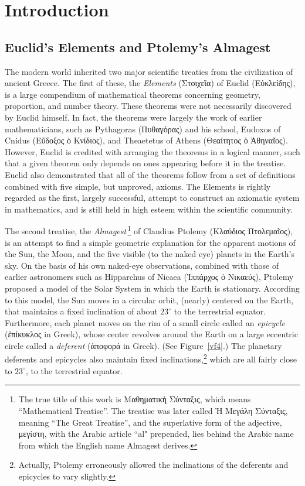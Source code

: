 \chapter{Introduction} 

\section{Euclid's Elements and Ptolemy's Almagest}
The modern world inherited two major scientific treaties from the civilization
of ancient Greece. 
The first of these, the  {\em Elements}\/ (Στοιχεῖα) of Euclid (Εὐκλείδης), is a
large compendium of mathematical theorems concerning geometry, proportion, and number
theory. These theorems were not necessarily discovered by Euclid
himself. In fact, the theorems were largely the work of earlier mathematicians,
such as Pythagoras (Πυθαγόρας) and his school, Eudoxos of Cnidus (Εὔδοξος ὁ Κνίδιος), and Theaetetus of Athens (Θεαίτητος ὁ Ἀθηναῖος). However, Euclid is credited with arranging the theorems 
 in a logical manner, such that a given theorem only depends on ones appearing before it in the treatise. Euclid also demonstrated  that all of the theorems follow from a set of definitions combined with five simple, but unproved, axioms. 
The Elements is rightly regarded
as the first, largely successful, attempt to construct an
axiomatic system in mathematics, and is still held in high esteem within
the scientific community.

The second treatise, the {\em Almagest}\,\footnote{The true title
of this work is Μαθηματικὴ Σύνταξις, which means ``Mathematical Treatise''.  The treatise was later called  Ἡ Μεγάλη Σύνταξις,  meaning ``The Great Treatise'',
and the superlative form of the adjective, μεγίστη,  with the Arabic article ``al" prepended, lies behind the Arabic name from which the English name Almagest derives.} of Claudius Ptolemy (Κλαύδιος Πτολεμαῖ\-ος), 
is an attempt to find a simple geometric explanation for the apparent motions of the Sun,
the Moon, and the five visible (to the naked eye) planets in the Earth's sky.  On the basis of his own naked-eye observations, combined with those of earlier astronomers such as Hipparchus of Nicaea (Ἱππάρχος ὁ Νικαεύς), Ptolemy proposed  a model of the Solar System in which the Earth is stationary.
According to this model, the Sun moves in a circular orbit, (nearly) centered on the Earth, that 
maintains a fixed inclination of about $23^\circ$ to the  terrestrial equator.
Furthermore, each planet moves  on the rim of a small
circle called an {\em epicycle}\/ (ἐπίκυκλος in Greek), whose center revolves around the Earth
on a large eccentric circle called  a {\em deferent}\/ (ἀποφορά in Greek). (See Figure~\ref{vf4}.) The
planetary deferents and epicycles also
maintain fixed inclinations,\footnote{Actually, Ptolemy erroneously allowed the inclinations of the
deferents and epicycles to vary slightly.} which are all fairly close to $23^\circ$,
to the  terrestrial equator. 

